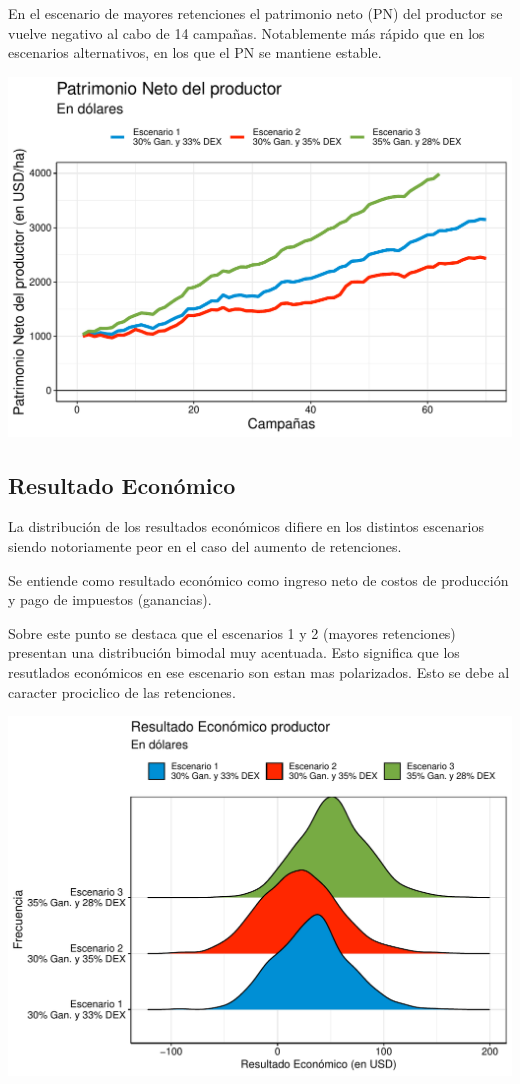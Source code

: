 \documentclass[
  12pt,
  spanish,
  10pt]{article}
\begin{document}
En el escenario de mayores retenciones el patrimonio neto (PN) del
productor se vuelve negativo al cabo de 14 campañas. Notablemente más
rápido que en los escenarios alternativos, en los que el PN se mantiene
estable.

\begin{center}\includegraphics{simulacion_retenciones_bagging_files/figure-latex/unnamed-chunk-16-1} \end{center}

\hypertarget{resultado-econuxf3mico}{%
\subsection{Resultado Económico}\label{resultado-econuxf3mico}}

La distribución de los resultados económicos difiere en los distintos
escenarios siendo notoriamente peor en el caso del aumento de
retenciones.

Se entiende como resultado económico como ingreso neto de costos de
producción y pago de impuestos (ganancias).

Sobre este punto se destaca que el escenarios 1 y 2 (mayores
retenciones) presentan una distribución bimodal muy acentuada. Esto
significa que los resutlados económicos en ese escenario son estan mas
polarizados. Esto se debe al caracter prociclico de las retenciones.

\includegraphics{simulacion_retenciones_bagging_files/figure-latex/unnamed-chunk-18-1.pdf}
\end{document}
